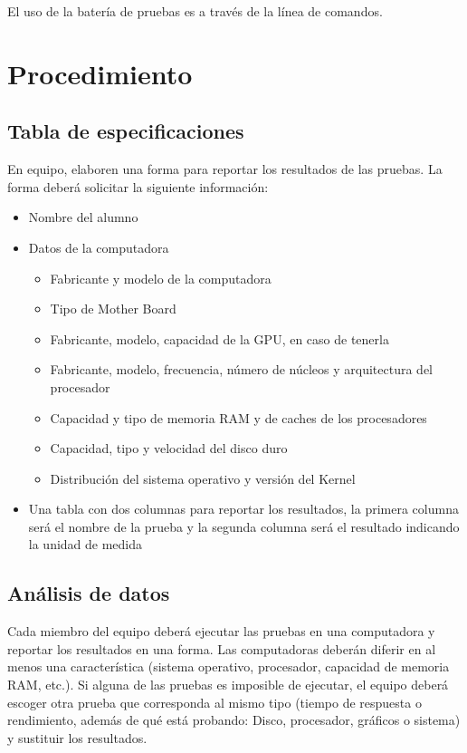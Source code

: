 \documentclass{article}
\begin{document}
El uso de la batería de pruebas es a través de la línea de comandos.

\section{Procedimiento}

\subsection{Tabla de especificaciones}

En equipo, elaboren una forma para reportar los resultados de las pruebas. La forma deberá solicitar la siguiente información:

\begin{itemize}
\item Nombre del alumno
\item Datos de la computadora
\begin{itemize}
\item Fabricante y modelo de la computadora
\item Tipo de Mother Board
\item Fabricante, modelo, capacidad de la GPU, en caso de tenerla
\item Fabricante, modelo, frecuencia, número de núcleos y arquitectura del procesador
\item Capacidad y tipo de memoria RAM y de caches de los procesadores
\item Capacidad, tipo y velocidad del disco duro
\item Distribución del sistema operativo y versión del Kernel
\end{itemize}
\item Una tabla con dos columnas para reportar los resultados, la primera columna será el nombre de la prueba y la segunda columna será el resultado indicando la unidad de medida
\end{itemize}

\subsection{Análisis de datos}

Cada miembro del equipo deberá ejecutar las pruebas en una computadora y reportar los resultados en una forma. Las computadoras deberán diferir en al menos una característica (sistema operativo, procesador, capacidad de memoria RAM, etc.). Si alguna de las pruebas es imposible de ejecutar, el equipo deberá escoger otra prueba que corresponda al mismo tipo (tiempo de respuesta o rendimiento, además de qué está probando: Disco, procesador, gráficos o sistema) y sustituir los resultados.
\end{document}
